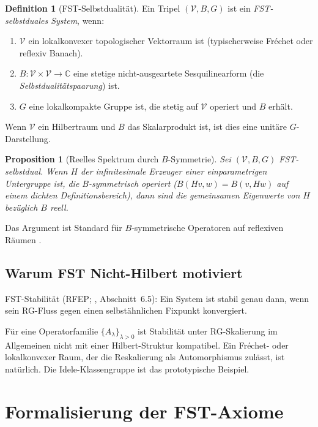 \documentclass[11pt,a4paper]{article}
\theoremstyle{plain}
\newtheorem{proposition}[theorem]{Proposition}
\theoremstyle{definition}
\newtheorem{definition}[theorem]{Definition}
\newcommand{\C}{\mathbb{C}}
\newcommand{\V}{\mathcal{V}}
\begin{document}
\begin{definition}[FST-Selbstdualität]
\label{def:fst-duality}
Ein Tripel $(\V, B, G)$ ist ein \emph{FST-selbstduales System}, wenn:
\begin{enumerate}[leftmargin=*]
  \item $\V$ ein lokalkonvexer topologischer Vektorraum ist (typischerweise
    Fr\'echet oder reflexiv Banach).
  \item $B: \V \times \V \to \C$ eine stetige nicht-ausgeartete
    Sesquilinearform (die \emph{Selbstdualitätspaarung}) ist.
  \item $G$ eine lokalkompakte Gruppe ist, die stetig auf $\V$ operiert
    und $B$ erhält.
\end{enumerate}
\end{definition}

Wenn $\V$ ein Hilbertraum und $B$ das Skalarprodukt ist, ist dies eine unitäre
$G$-Darstellung.

\begin{proposition}[Reelles Spektrum durch $B$-Symmetrie]
\label{prop:real-spectrum}
Sei $(\V, B, G)$ FST-selbstdual. Wenn $H$ der infinitesimale
Erzeuger einer einparametrigen Untergruppe ist, die $B$-symmetrisch operiert
($B(Hv, w) = B(v, Hw)$ auf einem dichten Definitionsbereich), dann sind die gemeinsamen
Eigenwerte von $H$ bezüglich $B$ reell.
\end{proposition}

Das Argument ist Standard für $B$-symmetrische Operatoren auf reflexiven
Räumen \cite{Meyer2005}.

\subsection{Warum FST Nicht-Hilbert motiviert}

FST-Stabilität (RFEP; \cite{MathMaster}, Abschnitt~6.5): Ein System ist stabil genau dann, wenn sein RG-Fluss
gegen einen selbstähnlichen Fixpunkt konvergiert.

Für eine Operatorfamilie $\{A_\lambda\}_{\lambda > 0}$ ist Stabilität
unter RG-Skalierung im Allgemeinen nicht mit einer Hilbert-Struktur kompatibel.
Ein Fr\'echet- oder lokalkonvexer Raum, der die Reskalierung als
Automorphismus zulässt, ist natürlich. Die Idele-Klassengruppe ist
das prototypische Beispiel.

\section{Formalisierung der FST-Axiome}
\label{sec:axioms}
\end{document}
